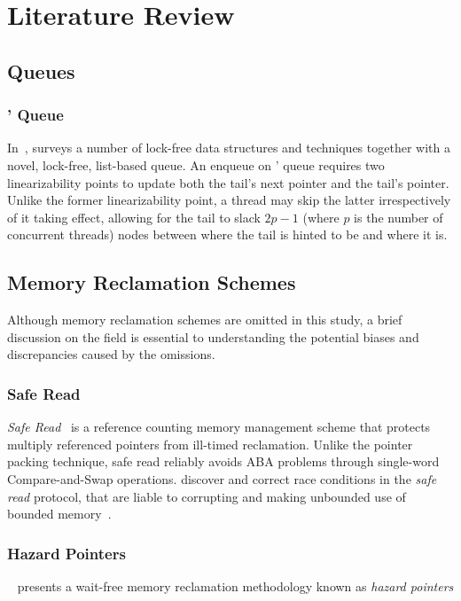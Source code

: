 \chapter{Literature Review}
\label{chap:lit_review}

\section{Queues}
\subsection{\citeauthor{valois1994queues}' Queue}
In~\citep{valois1994queues,valois1995datastructures}, \citeauthor{valois1994queues}
surveys a number of lock-free data structures and techniques \textemdash together with a novel, lock-free,
list-based queue. 
An enqueue on \citeauthor{valois1994queues}' queue requires two linearizability points 
to update both the tail's next pointer and the tail's pointer.
Unlike the former linearizability point, a thread may skip the latter irrespectively
of it taking effect, allowing for the tail to slack $2p-1$ (where $p$ is the number of concurrent threads)
nodes between where the tail is hinted to be and where it is.

\section{Memory Reclamation Schemes}
Although memory reclamation schemes are omitted in this study, a brief discussion
on the field is essential to understanding the potential biases and discrepancies caused
by the omissions.
\subsection{Safe Read}
\emph{Safe Read}~\citep{valois1994queues,valois1995datastructures} 
is a reference counting memory management scheme that protects multiply referenced
pointers from ill-timed reclamation. 
Unlike the pointer packing technique, safe read reliably avoids ABA problems through
single-word Compare-and-Swap operations. \citeauthor{michael1995correction} discover
and correct race conditions in the \emph{safe read} protocol, that are liable to
corrupting and making unbounded use of bounded memory~\citep{michael1995correction}.
\subsection{Hazard Pointers}
\citeauthor{michael2004hazard}~\citep{michael2004hazard} presents a wait-free
memory reclamation methodology known as \emph{hazard pointers}

